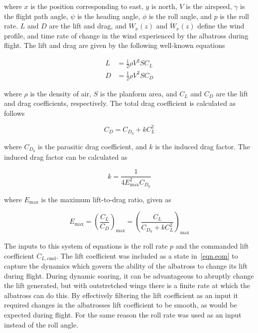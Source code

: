 \documentclass[11pt,letterpaper,onecolumn]{article}
\begin{document}
where $x$ is the position corresponding to east, $y$ is north, $V$ is the airspeed, $\gamma$ is the flight path angle, $\psi$ is the heading angle, $\phi$ is the roll angle, and $p$ is the roll rate.
$L$ and $D$ are the lift and drag, and $W_{x}(z)$ and $\dot{W}_{x}(z)$ define the wind profile, and time rate of change in the wind experienced by the albatross during flight.
The lift and drag are given by the following well-known equations

\begin{align}
  L &=\frac{1}{2}\rho V^{2}SC_{L} \\
  D &=\frac{1}{2}\rho V^{2}SC_{D}
\end{align}

where $\rho$ is the density of air, $S$ is the planform area, and $C_{L}$ and $C_{D}$ are the lift and drag coefficients, respectively.
The total drag coefficient is calculated as follows

\begin{equation}
  C_{D}=C_{D_{0}}+kC_{L}^{2}
\end{equation}

where $C_{D_{0}}$ is the parasitic drag coefficient, and $k$ is the induced drag factor.
The induced drag factor can be calculated as

\begin{equation}
  k=\frac{1}{4E_{\text{max}}^{2}C_{D_{0}}}
\end{equation}

where $E_{\text{max}}$ is the maximum lift-to-drag ratio, given as

\begin{equation}
  E_{\text{max}}=\left(\frac{C_{L}}{C_{D}}\right)_{\text{max}}
  =\left(\frac{C_{L}}{C_{D_{0}}+kC_{L}^{2}}\right)_{\text{max}}
\end{equation}

The inputs to this system of equations is the roll rate $p$ and the commanded lift coefficient $C_{L,\text{cmd}}$.
The lift coefficient was included as a state in~\eqref{eqn.eom} to capture the dynamics which govern the ability of the albatross to change its lift during flight.
During dynamic soaring, it can be advantageous to abruptly change the lift generated, but with outstretched wings there is a finite rate at which the albatross can do this.
By effectively filtering the lift coefficient as an input it required changes in the albatrosses lift coefficient to be smooth, as would be expected during flight.
For the same reason the roll rate was used as an input instead of the roll angle.
\end{document}
